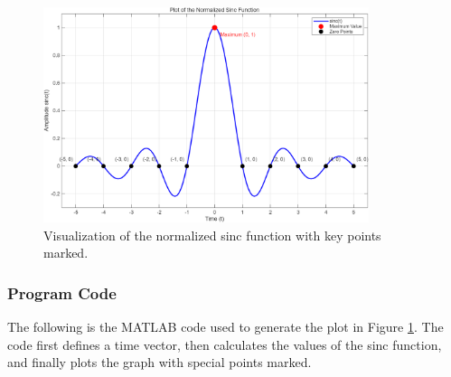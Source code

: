 \documentclass[12pt, a4paper, twoside]{ctexart}
\begin{document}
\begin{figure}[H]
    \centering
    \includegraphics[width=0.85\textwidth,keepaspectratio]{sinc.png}
    \caption{Visualization of the normalized sinc function with key points marked.}
    \label{fig:sinc}
\end{figure}

\subsubsection*{\heiti{}Program Code}
The following is the MATLAB code used to generate the plot in Figure \ref{fig:sinc}. The code first defines a time vector, then calculates the values of the sinc function, and finally plots the graph with special points marked.
\end{document}
